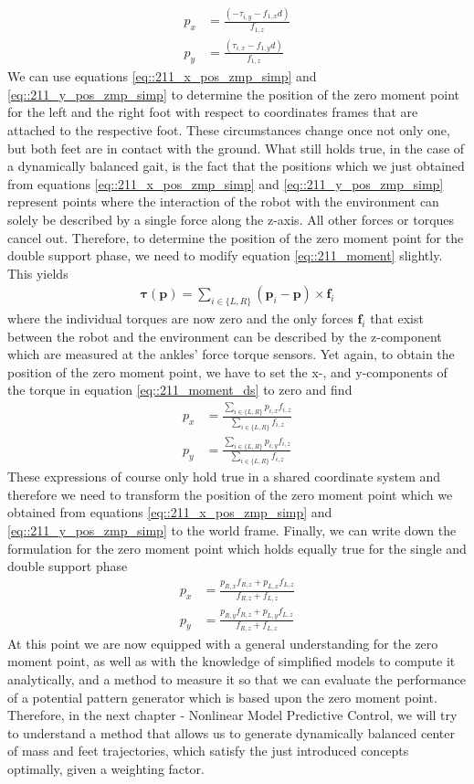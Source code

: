 \begin{align}
	p_x &= \frac{(-\tau_{i,y}-f_{1,x}d)}{f_{1,z}} 
	\label{eq::211_x_pos_zmp_simp}\\
	p_y &= \frac{(\tau_{i,x}-f_{1,y}d)}{f_{1,z}}
	\label{eq::211_y_pos_zmp_simp}
\end{align}
We can use equations \ref{eq::211_x_pos_zmp_simp} and \ref{eq::211_y_pos_zmp_simp} to determine the position of the zero moment point for the left and the right foot with respect to coordinates frames that are attached to the respective foot. These circumstances change once not only one, but both feet are in contact with the ground. What still holds true, in the case of a dynamically balanced gait, is the fact that the positions which we just obtained from equations \ref{eq::211_x_pos_zmp_simp} and \ref{eq::211_y_pos_zmp_simp} represent points where the interaction of the robot with the environment can solely be described by a single force along the z-axis. All other forces or torques cancel out. Therefore, to determine the position of the zero moment point for the double support phase, we need to modify equation \ref{eq::211_moment} slightly. This yields 
\begin{align}
	\bm{\tau}(\bm{p}) = \sum_{i\in\{L, R\}} (\bm{p}_i - \bm{p})\times\bm{f}_i
	\label{eq::211_moment_ds}
\end{align}
where the individual torques are now zero and the only forces $\bm{f}_i$ that exist between the robot and the environment can be described by the z-component which are measured at the ankles' force torque sensors. Yet again, to obtain the position of the zero moment point, we have to set the x-, and y-components of the torque in equation \ref{eq::211_moment_ds} to zero and find
\begin{align}
	p_x &= \frac{\sum_{i\in\{L, R\}}p_{i,x}f_{i,z}}{\sum_{i\in\{L, R\}}f_{i,z}} \\
	p_y &= \frac{\sum_{i\in\{L, R\}}p_{i,y}f_{i,z}}{\sum_{i\in\{L, R\}}f_{i,z}}
\end{align}
These expressions of course only hold true in a shared coordinate system and therefore we need to transform the position of the zero moment point which we obtained from equations \ref{eq::211_x_pos_zmp_simp} and \ref{eq::211_y_pos_zmp_simp} to the world frame. Finally, we can write down the formulation for the zero moment point which holds equally true for the single and double support phase
\begin{align}
	p_x &= \frac{p_{R,x}f_{R,z}+p_{L,x}f_{L,z}}{f_{R,z}+f_{L,z}} 
	\label{eq::211_double_zmp_x} \\
	p_y &= \frac{p_{R,y}f_{R,z}+p_{L,y}f_{L,z}}{f_{R,z}+f_{L,z}}
	\label{eq::211_double_zmp_y}
\end{align}
At this point we are now equipped with a general understanding for the zero moment point, as well as with the knowledge of simplified models to compute it analytically, and a method to measure it so that we can evaluate the performance of a potential pattern generator which is based upon the zero moment point. Therefore, in the next chapter - Nonlinear Model Predictive Control, we will try to understand a method that allows us to generate dynamically balanced center of mass and feet trajectories, which satisfy the just introduced concepts optimally, given a weighting factor.
